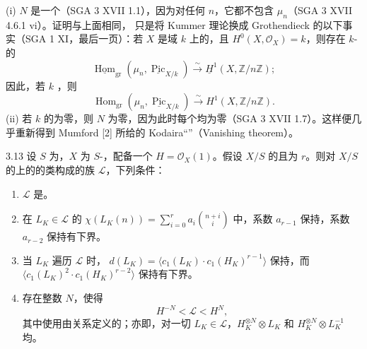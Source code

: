 (i)  $N$ 是一个（SGA 3 XVII 1.1），因为对任何 $n$，它都不包含 $\mu_n$（SGA 3 XVII 4.6.1 vi）。证明与上面相同，
只是将 Kummer 理论换成 Grothendieck 的以下事实（SGA 1 XI，最后一页）：若 $X$ 是域 $k$ 上的，且 $H^0(X,\mathcal O_X)=k$，则存在 $k$-的
\[\underline{\operatorname{Hom}}_{\mathrm{gr}}(\mu_n,\underline{\operatorname{Pic}}_{X/k})\xrightarrow\sim\underline{H}^1(X,\mathbb Z/n\mathbb Z);\]
因此，若 $k$ ，则
\[\operatorname{Hom}_{\mathrm{gr}}(\mu_n,\underline{\operatorname{Pic}}_{X/k})\xrightarrow\sim H^1(X,\mathbb Z/n\mathbb Z).\]
(ii) 若 $k$ 的为零，则 $N$ 为零，因为此时每个均为零（SGA 3 XVII 1.7）。这样便几乎重新得到 Mumford [2] 所给的 Kodaira“”（Vanishing theorem）。
\begin{SGAresult}{}{3.13}
设 $S$ 为，$X$ 为 $S$-，配备一个 $H=\mathcal O_X(1)$。假设 $X/S$ 的且为 $r$。则对 $X/S$ 的上的的类构成的族 $\mathscr L$，下列条件：
\begin{enumerate}
\item[(i)] $\mathscr L$ 是。
\item[(ii)] 在 $L_K\in\mathscr L$ 的 $\chi(L_K(n))=\sum_{i=0}^r a_i\binom{n+i}{i}$ 中，系数 $a_{r-1}$ 保持，系数 $a_{r-2}$ 保持有下界。
\item[(iii)] 当 $L_K$ 遍历 $\mathscr L$ 时， $d(L_K)=\langle c_1(L_K)\cdot c_1(H_K)^{r-1}\rangle$ 保持，而 $\langle c_1(L_K)^2\cdot c_1(H_K)^{r-2}\rangle$ 保持有下界。
\item[(iv)] 存在整数 $N$，使得
\[H^{-N}<\mathscr L<H^N,\]
其中使用由关系定义的；亦即，对一切 $L_K\in\mathscr L$，$H_K^{\otimes N}\otimes L_K$ 和 $H_K^{\otimes N}\otimes L_K^{-1}$ 均。
\end{enumerate}
\end{SGAresult}
